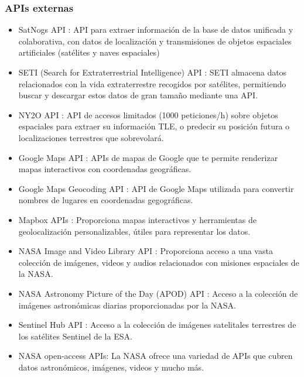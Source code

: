 \subsubsection*{APIs externas}
\begin{itemize}
  \item SatNogs API \cite{satnogs-api}: API para extraer información de la base de datos unificada y colaborativa, con datos de localización y transmisiones de objetos espaciales artificiales (satélites y naves espaciales)
  \item SETI (Search for Extraterrestrial Intelligence) API \cite{seti-api}: SETI almacena datos relacionados con la vida extraterrestre recogidos por satélites, permitiendo buscar y descargar estos datos de gran tamaño mediante una API.
  \item NY2O API \cite{ny2o-api}: API de accesos limitados (1000 peticiones/h) sobre objetos espaciales para extraer su información TLE, o predecir su posición futura o localizaciones terrestres que sobrevolará.

  \item Google Maps API \cite{google-maps-api}: APIs de mapas de Google que te permite renderizar mapas interactivos con coordenadas geográficas.
  \item Google Maps Geocoding API \cite{google-maps-geocoding-api}: API de Google Maps utilizada para convertir nombres de lugares en coordenadas gegográficas.
  \item Mapbox APIs \cite{mapbox-api}: Proporciona mapas interactivos y herramientas de geolocalización personalizables, útiles para representar los datos.

  \item NASA Image and Video Library API \cite{nasa-media-library-api}: Proporciona acceso a una vasta colección de imágenes, videos y audios relacionados con misiones espaciales de la NASA.
  \item NASA Astronomy Picture of the Day (APOD) API \cite{nasa-apod-api}: Acceso a la colección de imágenes astronómicas diarias proporcionadas por la NASA.
  \item Sentinel Hub API \cite{sentinel-api}: Acceso a la colección de imágenes satelitales terrestres de los satélites Sentinel de la ESA.

  \item NASA open-access APIs\cite{nasa-open-api}: La NASA ofrece una variedad de APIs que cubren datos astronómicos, imágenes, videos y mucho más.
\end{itemize}


